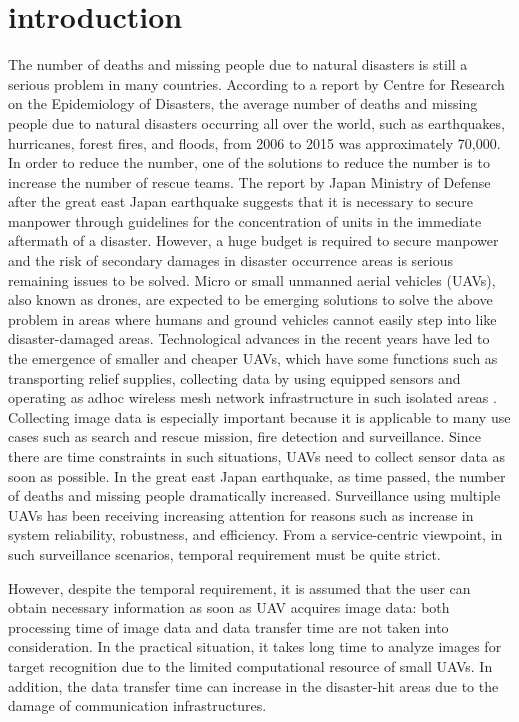 \documentclass{ieeeaccess}
\begin{document}
\section{introduction}\label{intro}
The number of deaths and missing people due to natural disasters is still a serious problem in many countries.
According to a report by Centre for Research on the Epidemiology of Disasters\cite{CRED2016}, the average number of deaths and missing people due to natural disasters occurring all over the world, such as earthquakes, hurricanes, forest fires, and floods, from 2006 to 2015 was approximately 70,000.
In order to reduce the number, one of the solutions to reduce the number is to increase the number of rescue teams.
The report by Japan Ministry of Defense after the great east Japan earthquake suggests that  it is necessary to secure manpower through guidelines for the concentration of units in the immediate aftermath of a disaster.
%
However, a huge budget is required to secure manpower and the risk of secondary damages in disaster occurrence areas is serious remaining issues to be solved\cite{disaster2011}.
%
Micro or small unmanned aerial vehicles (UAVs), also known as drones, are expected to be emerging solutions to solve the above problem in areas where humans and ground vehicles cannot easily step into like disaster-damaged areas.
Technological advances in the recent years have led to the emergence of smaller and cheaper UAVs, which have some functions such as transporting relief supplies, collecting data by using equipped sensors and operating as adhoc wireless mesh network infrastructure in such isolated areas \cite{Andre2014,Erdelj2016,Felice2014}.
Collecting image data is especially important because it is applicable to many use cases such as search and rescue mission, fire detection and surveillance.
%
Since there are time constraints in such situations, UAVs need to collect sensor data as soon as possible.
In the great east Japan earthquake, as time passed, the number of deaths and missing people  dramatically increased\cite{japan2011}.
Surveillance using multiple UAVs has been receiving increasing attention for reasons such as increase in system reliability, robustness, and efficiency\cite{Lanillos2014,Maza2007,Meng2014,chang2016,Mirzaei2011}.
From a service-centric viewpoint, in such surveillance scenarios, temporal requirement must be quite strict.

However, despite the temporal requirement, it is assumed that the user can obtain necessary information as soon as UAV acquires image data: both processing time of image data and data transfer time are not taken into consideration. In the practical situation, it takes long time to analyze images for target recognition due to the limited computational resource of small UAVs. In addition, the data transfer time can increase in the disaster-hit areas due to the damage of communication infrastructures.
\end{document}
